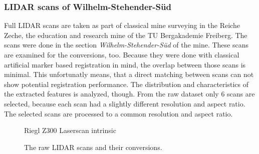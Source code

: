 \subsubsection{\acrshort{LIDAR} scans of Wilhelm-Stehender-Süd}

Full \acrshort{LIDAR} scans are taken as part of classical mine surveying in the Reiche Zeche, the education and research mine of the TU Bergakademie Freiberg.
The scans were done in the section \emph{Wilhelm-Stehender-Süd} of the mine.
These scans are examined for the conversions, too.
Because they were done with classical artificial marker based registration in mind, the overlap between those scans is minimal.
This unfortunatly means, that a direct matching between scans can not show potential registration performance.
The distribution and characteristics of the extracted features is analyzed, though.
From the raw dataset only 6 scans are selected, because each scan had a slightly different resolution and aspect ratio.
The selected scans are processed to a common resolution and aspect ratio.
\begin{figure}[H]
\CenterFloatBoxes%
\begin{floatrow}
    {\caption{Riegl Z300 Laserscan intrinsic}\label{tab:scan_intrinsic}}%
    {\caption{The raw \acrshort{LIDAR} scans and their conversions.}\label{fig:scans}}
\end{floatrow}
\end{figure}

